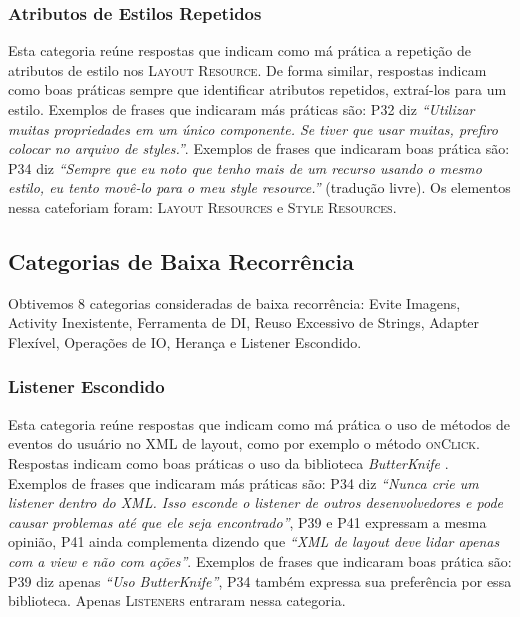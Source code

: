 \subsubsection{Atributos de Estilos Repetidos}
Esta categoria re\'une respostas que indicam como m\'a pr\'atica a repetição de atributos de estilo nos \textsc{Layout Resource}. De forma similar, respostas indicam como boas pr\'aticas sempre que identificar atributos repetidos, extraí-los para um estilo. Exemplos de frases que indicaram m\'as pr\'aticas s\~ao: P32 diz \textit{``Utilizar muitas propriedades em um \'unico componente. Se tiver que usar muitas, prefiro colocar no arquivo de styles.''}. Exemplos de frases que indicaram boas pr\'atica s\~ao: P34 diz \textit{``Sempre que eu noto que tenho mais de um recurso usando o mesmo estilo, eu tento mov\^e-lo para o meu \textit{style resource}.''} (tradu\c{c}\~ao livre). Os elementos nessa cateforiam foram: \textsc{Layout Resources} e \textsc{Style Resources}.


\subsection{Categorias de Baixa Recorr\^encia}
Obtivemos 8 categorias consideradas de baixa recorr\^encia: Evite Imagens, Activity Inexistente, Ferramenta de DI, Reuso Excessivo de Strings, Adapter Flex\'ivel, Opera\c{c}\~oes de IO, Heran\c{c}a e Listener Escondido.



\subsubsection{Listener Escondido}
Esta categoria re\'une respostas que indicam como m\'a pr\'atica o uso de métodos de eventos do usuário no XML de layout, como por exemplo o método \textsc{onClick}. Respostas indicam como boas pr\'aticas o uso da biblioteca \textit{ButterKnife} \cite{ButterKnife}. Exemplos de frases que indicaram m\'as pr\'aticas s\~ao: P34 diz \textit{``Nunca crie um listener dentro do XML. Isso esconde o listener de outros desenvolvedores e pode causar problemas até que ele seja encontrado''}, P39 e P41 expressam a mesma opinião, P41 ainda complementa dizendo que \textit{``XML de layout deve lidar apenas com a view e não com ações''}. Exemplos de frases que indicaram boas pr\'atica s\~ao: P39 diz apenas \textit{``Uso ButterKnife''}, P34 também expressa sua preferência por essa biblioteca. Apenas \textsc{Listeners} entraram nessa categoria.



